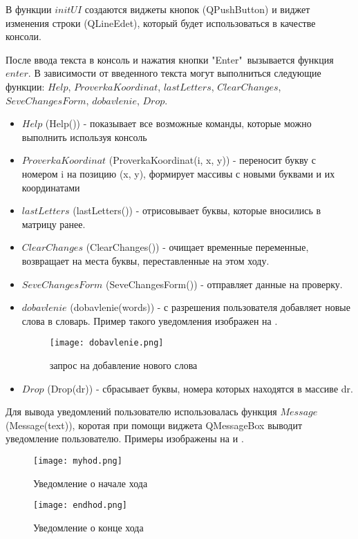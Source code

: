 \documentclass[a4paper,14pt]{article}
\begin{document}
	В функции $initUI$ создаются виджеты кнопок (QPushButton) и виджет изменения строки (QLineEdet), который будет использоваться в качестве консоли.
		
	После ввода текста в консоль и нажатия кнопки "Enter"\ вызывается функция $enter$.
	В зависимости от введенного текста могут выполниться следующие функции: $Help$, $ProverkaKoordinat$,  $lastLetters$,  $ClearChanges$, $SeveChangesForm$, $dobavlenie$, $Drop$.
	
	\begin {itemize}
	\item $Help$ (Help()) - показывает все возможные команды, которые можно выполнить используя консоль
	\item $ProverkaKoordinat$ (ProverkaKoordinat(i, x, y)) - переносит букву с номером i на позицию (x, y), формирует массивы с новыми буквами и их координатами	
	\item $lastLetters$ (lastLetters()) - отрисовывает буквы, которые вносились в матрицу ранее.
	\item $ClearChanges$ (ClearChanges()) - очищает временные переменные, возвращает на места буквы, переставленные на этом ходу.
	\item $SeveChangesForm$ (SeveChangesForm()) - отправляет данные на проверку.
	\item $dobavlenie$ (dobavlenie(words)) - с разрешения пользователя добавляет новые слова в словарь. Пример такого уведомления изображен на .
	\begin{figure}[bhtp]
		\centering
		\texttt{[image: dobavlenie.png]}
		\caption{запрос на добавление нового слова}
		\label{img:dob}
	\end{figure}
	\item $Drop$ (Drop(dr)) - сбрасывает буквы, номера которых находятся в массиве dr.
	\end {itemize}
	
	Для вывода уведомлений пользователю использовалась функция $Message$ (Message(text)), коротая при помощи виджета QMessageBox выводит уведомление пользователю.
	Примеры изображены на  и .
	\begin{figure}[H]
		\centering
		\texttt{[image: myhod.png]}
		\caption{Уведомление о начале хода}
		\label{img:startTurn}
	\end{figure}
	\begin{figure}[H]
		\centering
		\texttt{[image: endhod.png]}
		\caption{Уведомление о конце хода}
		\label{img:endTurn}
	\end{figure}
\end{document}
